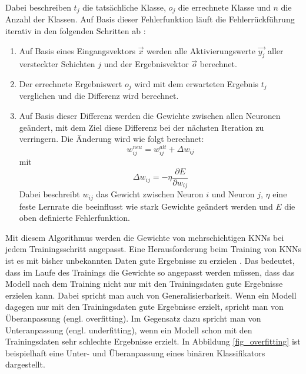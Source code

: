 Dabei beschreiben $t_j$ die tatsächliche Klasse, $o_j$ die errechnete Klasse und $n$ die Anzahl der Klassen. Auf Basis dieser Fehlerfunktion läuft die Fehlerrückführung iterativ in den folgenden Schritten ab \cite{bishop2006pattern}:

\begin{enumerate}
\item Auf Basis eines Eingangsvektors $\vec{x}$ werden alle Aktivierungswerte $\vec{y_j}$ aller versteckter Schichten $j$ und der Ergebnisvektor $\vec{o}$ berechnet.
\item Der errechnete Ergebniswert $o_j$ wird mit dem erwarteten Ergebnis $t_j$ verglichen und die Differenz wird berechnet.
\item Auf Basis dieser Differenz werden die Gewichte zwischen allen Neuronen geändert, mit dem Ziel diese Differenz bei der nächsten Iteration zu verringern. Die Änderung wird wie folgt berechnet:
\begin{equation}
w^{neu}_{ij} = w^{alt}_{ij} + \Delta w_{ij}
\end{equation}
mit
\begin{equation}
\Delta w_{ij} = -\eta \frac{\partial E}{\partial w_{ij}}
\end{equation}
Dabei beschreibt $w_{ij}$ das Gewicht zwischen Neuron $i$ und Neuron $j$, $\eta$ eine feste Lernrate die beeinflusst wie stark Gewichte geändert werden und $E$ die oben definierte Fehlerfunktion.
\end{enumerate}

Mit diesem Algorithmus werden die Gewichte von mehrschichtigen \acp{KNN} bei jedem Trainingsschritt angepasst. Eine Herausforderung beim Training von \acp{KNN} ist es mit bisher unbekannten Daten gute Ergebnisse zu erzielen \cite{srivastava2014dropout}. Das bedeutet, dass im Laufe des Trainings die Gewichte so angepasst werden müssen, dass das Modell nach dem Training nicht nur mit den Trainingsdaten gute Ergebnisse erzielen kann. Dabei spricht man auch von Generalisierbarkeit. Wenn ein Modell dagegen nur mit den Trainingsdaten gute Ergebnisse erzielt, spricht man von Überanpassung (engl. overfitting). Im Gegensatz dazu spricht man von Unteranpassung (engl. underfitting), wenn ein Modell schon mit den Trainingsdaten sehr schlechte Ergebnisse erzielt. In Abbildung \ref{fig_overfitting} ist beispielhaft eine Unter- und Überanpassung eines binären Klassifikators dargestellt.


